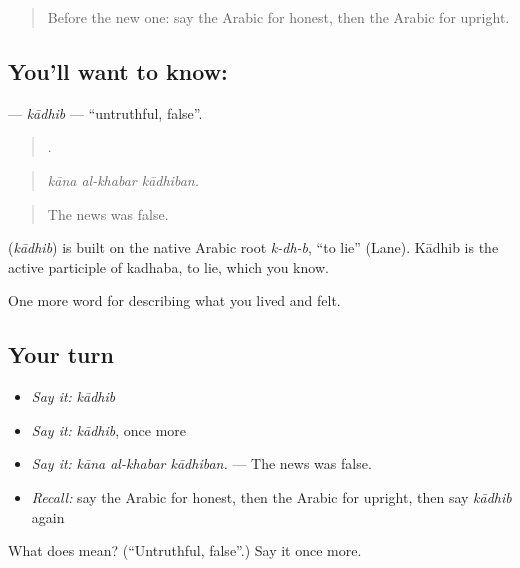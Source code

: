 \begin{quote}
Before the new one: say the Arabic for honest, then the Arabic for upright.
\end{quote}

\subsection*{You'll want to know: }
\textbf{} — \emph{kādhib} — \textquotedblleft{}untruthful, false\textquotedblright{}.

\begin{quote}
  .
\end{quote}

\begin{quote}
\emph{kāna al-khabar kādhiban.}
\end{quote}

\begin{quote}
The news was false.
\end{quote}

\begin{cousinweb}
\textbf{} (\emph{kādhib}) is built on the native Arabic root \emph{k-dh-b}, \textquotedblleft{}to lie\textquotedblright{} (Lane). Kādhib is the active participle of kadhaba, to lie, which you know.
\end{cousinweb}

\begin{grammarlens}[title={What you've built}]
One more word for describing what you lived and felt.
\end{grammarlens}

\subsection*{Your turn}
\begin{itemize}
\raggedright
  \item \emph{Say it:} \emph{kādhib}
  \item \emph{Say it:} \emph{kādhib}, once more
  \item \emph{Say it:} \emph{kāna al-khabar kādhiban.} — The news was false.
  \item \emph{Recall:} say the Arabic for honest, then the Arabic for upright, then say \emph{kādhib} again
\end{itemize}

\begin{tcolorbox}[breakable,colback=teal!4,colframe=teal!35!black,title={Before you move on}]
What does  mean? (\textquotedblleft{}Untruthful, false\textquotedblright{}.) Say it once more.
\end{tcolorbox}
